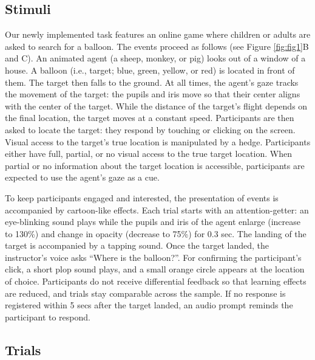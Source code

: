 \documentclass[
  man,floatsintext]{apa6}
\begin{document}
\hypertarget{stimuli}{%
\subsection{Stimuli}\label{stimuli}}

Our newly implemented task features an online game where children or adults are asked to search for a balloon.
The events proceed as follows (see Figure \ref{fig:fig1}B and C).
An animated agent (a sheep, monkey, or pig) looks out of a window of a house.
A balloon (i.e., target; blue, green, yellow, or red) is located in front of them.
The target then falls to the ground.
At all times, the agent's gaze tracks the movement of the target: the pupils and iris move so that their center aligns with the center of the target.
While the distance of the target's flight depends on the final location, the target moves at a constant speed.
Participants are then asked to locate the target: they respond by touching or clicking on the screen.
Visual access to the target's true location is manipulated by a hedge.
Participants either have full, partial, or no visual access to the true target location.
When partial or no information about the target location is accessible, participants are expected to use the agent's gaze as a cue.

To keep participants engaged and interested, the presentation of events is accompanied by cartoon-like effects.
Each trial starts with an attention-getter: an eye-blinking sound plays while the pupils and iris of the agent enlarge (increase to 130\%) and change in opacity (decrease to 75\%) for 0.3 sec.
The landing of the target is accompanied by a tapping sound.
Once the target landed, the instructor's voice asks ``Where is the balloon?''.
For confirming the participant's click, a short plop sound plays, and a small orange circle appears at the location of choice.
Participants do not receive differential feedback so that learning effects are reduced, and trials stay comparable across the sample.
If no response is registered within 5 secs after the target landed, an audio prompt reminds the participant to respond.

\hypertarget{trials}{%
\subsection{Trials}\label{trials}}
\end{document}
